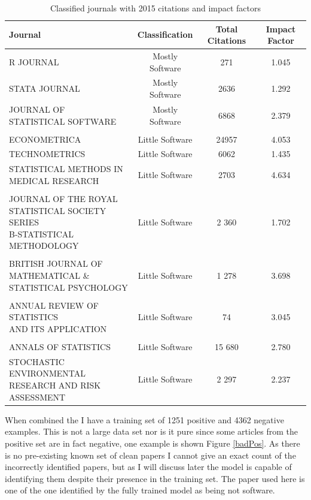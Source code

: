\documentclass[12pt, a4paper]{article}
\begin{document}
\begin{table}[H]
	\centering
	\begin{adjustbox}{center}
		\begin{tabular}{lccc}
			\toprule
			Journal & Classification & Total Citations & Impact Factor\\
			\midrule
			R JOURNAL & Mostly Software & 271 & 1.045\\
			STATA JOURNAL&Mostly Software&2636&1.292\\
			\pbox{20cm}{JOURNAL OF\\STATISTICAL SOFTWARE}&Mostly Software &6868&2.379\\
			&&&\\
			ECONOMETRICA&Little Software&24957&4.053\\
			TECHNOMETRICS&Little Software&6062&1.435\\
			\pbox{20cm}{STATISTICAL METHODS IN\\ MEDICAL RESEARCH}& Little Software &2703&4.634\\
			&&&\\
			\pbox{20cm}{JOURNAL OF THE ROYAL\\STATISTICAL SOCIETY SERIES\\B-STATISTICAL METHODOLOGY} &Little Software&2 360 &1.702\\
			&&&\\
			\pbox{20cm}{BRITISH JOURNAL OF MATHEMATICAL \&\\ STATISTICAL PSYCHOLOGY}&Little Software&1 278 &3.698\\
			&&&\\
			\pbox{20cm}{ANNUAL REVIEW OF STATISTICS\\ AND ITS APPLICATION}&Little Software&74 & 3.045\\
			&&&\\
			ANNALS OF STATISTICS&Little Software&15 680 &2.780\\
			\pbox{20cm}{STOCHASTIC ENVIRONMENTAL \\RESEARCH AND RISK ASSESSMENT}&Little Software&2 297 &2.237\\
			\bottomrule
		\end{tabular}
	\end{adjustbox}
	\caption{Classified journals with 2015 citations and impact factors}\label{journals}
\end{table}

When combined the I have a training set of 1251 positive and 4362 negative examples. This is not a large data set nor is it pure since some articles from the positive set are in fact negative, one example\citep{wickham2014tidy} is shown Figure \ref{badPos}. As there is no pre-existing known set of clean papers I cannot give an exact count of the incorrectly identified papers, but as I will discuss later the model is capable of identifying them despite their presence in the training set. The paper used here is one of the one identified by the fully trained model as being not software.
\end{document}
